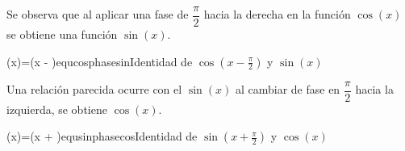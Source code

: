 Se observa que al aplicar una fase de $\dfrac{\pi}{2}$ hacia la derecha en la función $\cos(x)$ se obtiene una función $\sin(x)$.

\begin{listequbox}
  {\sin(x)=\cos\left(x - \right)}{equcosphasesin}{Identidad de $\cos(x - \frac{\pi}{2})$ y $\sin(x)$}
\end{listequbox}

Una relación parecida ocurre con el $\sin(x)$ al cambiar de fase en $\dfrac{\pi}{2}$ hacia la izquierda, se obtiene $\cos(x)$.


\begin{listequbox}
  {\cos(x)=\sin\left(x + \right)}{equsinphasecos}{Identidad de $\sin(x + \frac{\pi}{2})$ y $\cos(x)$}
\end{listequbox}
